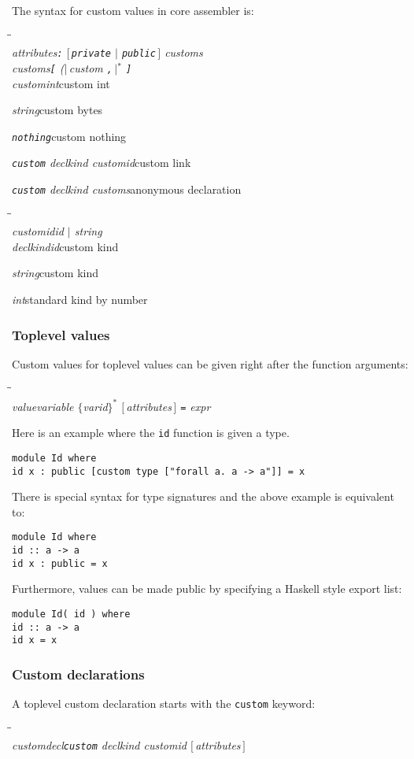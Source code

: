 \documentclass[a4paper,dvips]{article}
\newenvironment{productions}%
  {\begin{tabbing}\hspace{2cm}\=\hspace{6cm}\=\kill{}\\}%
  {\end{tabbing}}
\newcommand{\fixed}[1]{\makebox[3.5em]{#1}}
\newcommand{\production}[3]{\nont{#1}\>\fixed{$\rightarrow$}\nont{#2}\>#3\\}
\newcommand{\next}[2]{\strut{}\>\fixed{$|$}\nont{#1}\>#2\\}
\newcommand{\nont}[1]{\textit{#1}}
\newcommand{\opt}[1]{$[\,$#1$\,]$}
\newcommand{\many}[1]{$\{$#1$\}^*$}
\newcommand{\sepby}[2]{{\rm (}\hspace{-0.5ex}$|\,$#1 #2$\,|$\hspace{-0.5ex}{\rm )}$^*$}
\newcommand{\term}[1]{{\tt #1}}
\newcommand{\por}{$|$}
\begin{document}
The syntax for custom values in core assembler is:

\begin{productions}
\production{attributes}{\term{:} \opt{\term{private} \por{} \term{public}} \nont{customs}}{}
\production{customs}{\term{[} \sepby{\nont{custom}}{\term{,}} \term{]}}{}
\production{custom}{\nont{int}}{custom int}
\next{\nont{string}}{custom bytes}
\next{\term{nothing}}{custom nothing}
\next{\term{custom} \nont{declkind} \nont{customid}}{custom link}
\next{\term{custom} \nont{declkind} \nont{customs}}{anonymous declaration}
\end{productions}
\begin{productions}
\production{customid}{\nont{id} \por{} \nont{string}}{}
\production{declkind}{\nont{id}}{custom kind}
\next{\nont{string}}{custom kind}
\next{\nont{int}}{standard kind by number}
\end{productions}

\subsubsection{Toplevel values}
Custom values for toplevel values can be given right after the
function arguments:
\begin{productions}
\production{value}{\nont{variable} \many{\nont{varid}} \opt{\nont{attributes}} \term{=} \nont{expr}}{}
\end{productions}

Here is an example where the \term{id} function is given a type.
\begin{verbatim}
module Id where
id x : public [custom type ["forall a. a -> a"]] = x
\end{verbatim}

There is special syntax for type signatures and the above example is equivalent to:
\begin{verbatim}
module Id where
id :: a -> a
id x : public = x
\end{verbatim}

Furthermore, values can be made public by specifying a Haskell style export list:
\begin{verbatim}
module Id( id ) where
id :: a -> a
id x = x
\end{verbatim}

\subsubsection{Custom declarations}
A toplevel custom declaration starts with the \term{custom} keyword:
\begin{productions}
\production{customdecl}{\term{custom} \nont{declkind} \nont{customid} \opt{\nont{attributes}}}{}
\end{productions}
\end{document}
